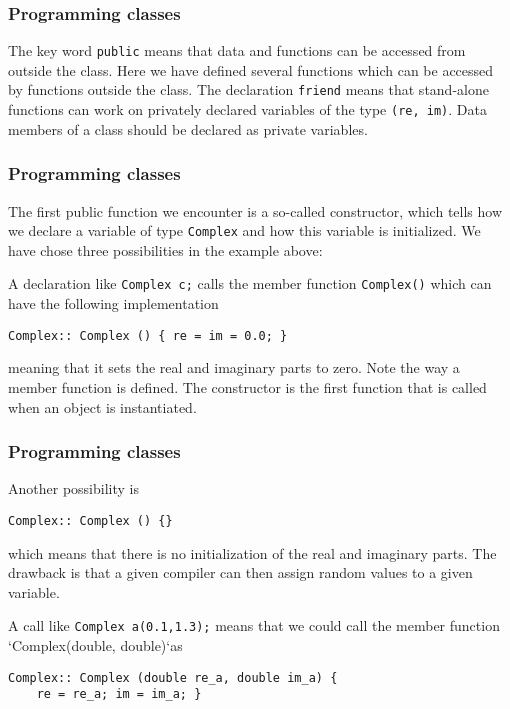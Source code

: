 \documentclass{beamer}
\begin{document}
\begin{frame}
\frametitle{Programming classes}

The key word \Verb!public! means  that data and functions can be accessed from outside the class.
Here we have defined several functions  which can be accessed by functions outside the class.
The declaration \Verb!friend! means that stand-alone functions can work on privately declared  variables  of the type
\Verb!(re, im)!.  Data members of a class should be declared as private variables.
\end{frame}

\begin{frame}
\frametitle{Programming classes}

The first public function we encounter is a so-called
constructor, which  tells how we declare a variable of type \Verb!Complex!
and how this variable is initialized. We have chose  three possibilities in the example above:

A declaration like \Verb!Complex c;! calls the member function \Verb!Complex()! which can have the following implementation

\begin{verbatim}
Complex:: Complex () { re = im = 0.0; }
\end{verbatim}

meaning that it sets the real and imaginary parts to zero. Note the
way a member function is defined. The constructor is the first
function that is called when an object is instantiated.
\end{frame}

\begin{frame}
\frametitle{Programming classes}

Another possibility is

\begin{verbatim}
Complex:: Complex () {}
\end{verbatim}
which means that there is no initialization of the real and imaginary parts. The drawback is that a given compiler can then assign random values to a given variable.

A call like \Verb!Complex a(0.1,1.3);! means that we could call the member function `Complex(double, double)`as

\begin{verbatim}
Complex:: Complex (double re_a, double im_a) {
    re = re_a; im = im_a; }
\end{verbatim}
\end{frame}
\end{document}
